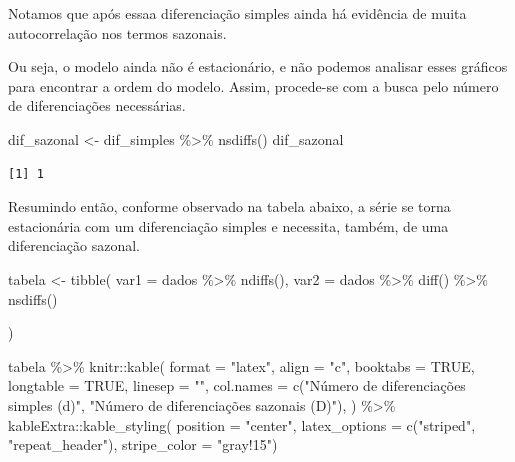 \documentclass[
  letterpaper,
  DIV=11,
  numbers=noendperiod]{scrartcl}
\newenvironment{Shaded}{\begin{snugshade}}{\end{snugshade}}
\newcommand{\AttributeTok}[1]{\textcolor[rgb]{0.40,0.45,0.13}{#1}}
\newcommand{\ConstantTok}[1]{\textcolor[rgb]{0.56,0.35,0.01}{#1}}
\newcommand{\FunctionTok}[1]{\textcolor[rgb]{0.28,0.35,0.67}{#1}}
\newcommand{\NormalTok}[1]{\textcolor[rgb]{0.00,0.23,0.31}{#1}}
\newcommand{\OtherTok}[1]{\textcolor[rgb]{0.00,0.23,0.31}{#1}}
\newcommand{\SpecialCharTok}[1]{\textcolor[rgb]{0.37,0.37,0.37}{#1}}
\newcommand{\StringTok}[1]{\textcolor[rgb]{0.13,0.47,0.30}{#1}}
\begin{document}
Notamos que após essaa diferenciação simples ainda há evidência de muita
autocorrelação nos termos sazonais.

Ou seja, o modelo ainda não é estacionário, e não podemos analisar esses
gráficos para encontrar a ordem do modelo. Assim, procede-se com a busca
pelo número de diferenciações necessárias.

\begin{Shaded}
\begin{Highlighting}[]
\NormalTok{dif\_sazonal }\OtherTok{\textless{}{-}}\NormalTok{ dif\_simples }\SpecialCharTok{\%\textgreater{}\%} \FunctionTok{nsdiffs}\NormalTok{()}
\NormalTok{dif\_sazonal}
\end{Highlighting}
\end{Shaded}

\begin{verbatim}
[1] 1
\end{verbatim}

Resumindo então, conforme observado na tabela abaixo, a série se torna
estacionária com um diferenciação simples e necessita, também, de uma
diferenciação sazonal.

\begin{Shaded}
\begin{Highlighting}[]
\NormalTok{tabela }\OtherTok{\textless{}{-}} \FunctionTok{tibble}\NormalTok{(}
  \AttributeTok{var1 =}\NormalTok{ dados }\SpecialCharTok{\%\textgreater{}\%} \FunctionTok{ndiffs}\NormalTok{(),}
  \AttributeTok{var2 =}\NormalTok{ dados }\SpecialCharTok{\%\textgreater{}\%} \FunctionTok{diff}\NormalTok{() }\SpecialCharTok{\%\textgreater{}\%} \FunctionTok{nsdiffs}\NormalTok{()}

\NormalTok{)}

\NormalTok{tabela }\SpecialCharTok{\%\textgreater{}\%}
\NormalTok{  knitr}\SpecialCharTok{::}\FunctionTok{kable}\NormalTok{(}
    \AttributeTok{format =} \StringTok{"latex"}\NormalTok{,}
    \AttributeTok{align =} \StringTok{"c"}\NormalTok{,}
    \AttributeTok{booktabs =} \ConstantTok{TRUE}\NormalTok{,}
    \AttributeTok{longtable =} \ConstantTok{TRUE}\NormalTok{,}
    \AttributeTok{linesep =} \StringTok{""}\NormalTok{,}
    \AttributeTok{col.names =} \FunctionTok{c}\NormalTok{(}\StringTok{"Número de diferenciações simples (d)"}\NormalTok{, }\StringTok{"Número de diferenciações sazonais (D)"}\NormalTok{),}
\NormalTok{    ) }\SpecialCharTok{\%\textgreater{}\%}
\NormalTok{  kableExtra}\SpecialCharTok{::}\FunctionTok{kable\_styling}\NormalTok{(}
      \AttributeTok{position =} \StringTok{"center"}\NormalTok{,}
      \AttributeTok{latex\_options =} \FunctionTok{c}\NormalTok{(}\StringTok{"striped"}\NormalTok{, }\StringTok{"repeat\_header"}\NormalTok{),}
      \AttributeTok{stripe\_color =} \StringTok{"gray!15"}\NormalTok{)}
\end{Highlighting}
\end{Shaded}
\end{document}
